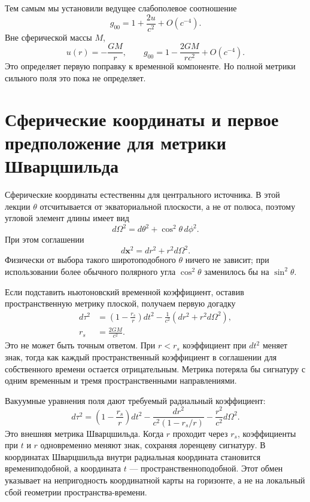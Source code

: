 Тем самым мы установили ведущее слабополевое соотношение
\begin{equation}
g_{00}=1+\frac{2u}{c^2}+O(c^{-4}).
\label{eq:l5-g00-newton}
\end{equation}
Вне сферической массы \(M\),
\begin{equation}
u(r)=-\frac{GM}{r},
\qquad
g_{00}=1-\frac{2GM}{rc^2}+O(c^{-4}).
\label{eq:l5-g00-spherical}
\end{equation}
Это определяет первую поправку к временной компоненте. Но полной метрики сильного поля это пока не определяет.

\section{Сферические координаты и первое предположение для метрики Шварцшильда}

Сферические координаты естественны для центрального источника. В этой лекции \(\theta\) отсчитывается от экваториальной плоскости, а не от полюса, поэтому угловой элемент длины имеет вид
\begin{equation}
d\Omega^2=d\theta^2+\cos^2\theta\,d\phi^2.
\label{eq:l5-angular-metric}
\end{equation}
При этом соглашении
\begin{equation}
d\mathbf{x}^2=dr^2+r^2d\Omega^2.
\label{eq:l5-flat-spherical}
\end{equation}
Физически от выбора такого широтоподобного \(\theta\) ничего не зависит; при использовании более обычного полярного угла \(\cos^2\theta\) заменилось бы на
\(\sin^2\theta\).

Если подставить ньютоновский временной коэффициент, оставив пространственную метрику плоской, получаем первую догадку
\begin{equation}
\begin{aligned}
d\tau^2
&=\left(1-\frac{r_s}{r}\right)dt^2
-\frac{1}{c^2}\left(dr^2+r^2d\Omega^2\right),\\
r_s&=\frac{2GM}{c^2}.
\end{aligned}
\label{eq:l5-naive-schwarzschild}
\end{equation}
Это не может быть точным ответом. При \(r<r_s\) коэффициент при \(dt^2\) меняет знак, тогда как каждый пространственный коэффициент в соглашении для собственного времени остается отрицательным. Метрика потеряла бы сигнатуру с одним временным и тремя пространственными направлениями.

Вакуумные уравнения поля дают требуемый радиальный коэффициент:
\begin{equation}
\boxed{
d\tau^2
=\left(1-\frac{r_s}{r}\right)dt^2
-\frac{dr^2}{c^2\left(1-r_s/r\right)}
-\frac{r^2}{c^2}d\Omega^2.
}
\label{eq:l5-schwarzschild}
\end{equation}
Это внешняя метрика Шварцшильда. Когда \(r\) проходит через \(r_s\), коэффициенты при \(t\) и \(r\) одновременно меняют знак, сохраняя лоренцеву сигнатуру. В координатах Шварцшильда внутри радиальная координата становится времениподобной, а координата \(t\) — пространственноподобной. Этот обмен указывает на непригодность координатной карты на горизонте, а не на локальный сбой геометрии пространства-времени.

